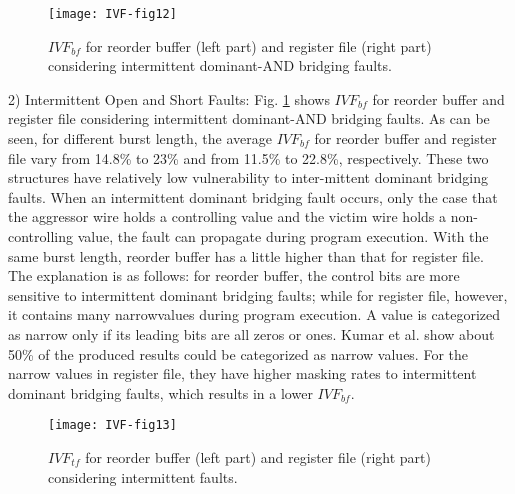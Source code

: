 \begin{figure}[t]
    \centering
    \texttt{[image: IVF-fig12]}\\
    \caption{$IVF_{bf}$ for reorder buffer (left part) and register file (right part) considering intermittent dominant-AND bridging faults.}
    \label{fig:IVF-and}
\end{figure}

2) Intermittent Open and Short Faults: Fig. \ref{fig:IVF-and} shows $IVF_{bf}$ for reorder buffer and register file considering intermittent dominant-AND bridging faults. As can be seen, for different burst length, the average $IVF_{bf}$ for reorder buffer and register file vary from 14.8\% to 23\% and from 11.5\% to 22.8\%, respectively. These two structures have relatively low vulnerability to inter-mittent dominant bridging faults. When an intermittent dominant bridging fault occurs, only the case that the aggressor wire holds a controlling value and the victim wire holds a non-controlling value, the fault can propagate during program execution. With the same burst length, reorder buffer has a little higher than that for register file. The explanation is as follows: for reorder buffer, the control bits are more sensitive to intermittent dominant bridging faults; while for register file, however, it contains many narrowvalues during program execution. A value is categorized as narrow only if its leading bits are all zeros or ones. Kumar et al. \cite{kumar2006reducing} show about 50\% of the produced results could be categorized as narrow values. For the narrow values in register file, they have higher masking rates to intermittent dominant bridging faults, which results in a lower $IVF_{bf}$.

\begin{figure}[t]
    \centering
    \texttt{[image: IVF-fig13]}\\
    \caption{$IVF_{tf}$ for reorder buffer (left part) and register file (right part) considering intermittent faults.}
    \label{fig:IVF-tf}
\end{figure}


